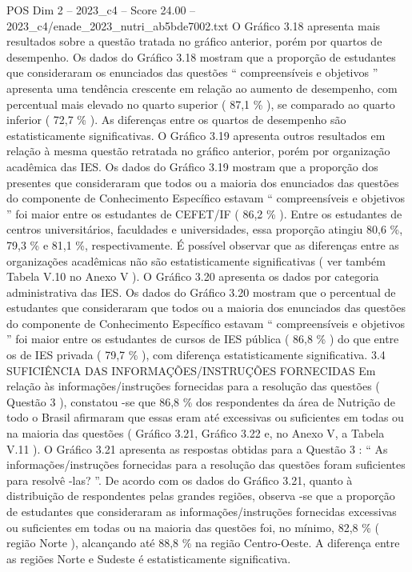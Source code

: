 \begin{textsample}{POS Dim 2 – 2023\_c4 – Score 24.00 – 2023\_c4/enade\_2023\_nutri\_ab5bde7002.txt}
O Gráfico 3.18 apresenta mais resultados sobre a questão tratada no gráfico anterior, porém por quartos de desempenho.
Os dados do Gráfico 3.18 mostram que a proporção de estudantes que consideraram os enunciados das questões “ compreensíveis e objetivos ” apresenta uma tendência crescente em relação ao aumento de desempenho, com percentual mais elevado no quarto superior ( 87,1 \% ), se comparado ao quarto inferior ( 72,7 \% ).
As diferenças entre os quartos de desempenho são estatisticamente significativas.
O Gráfico 3.19 apresenta outros resultados em relação à mesma questão retratada no gráfico anterior, porém por organização acadêmica das IES.
Os dados do Gráfico 3.19 mostram que a proporção dos presentes que consideraram que todos ou a maioria dos enunciados das questões do componente de Conhecimento Específico estavam “ compreensíveis e objetivos ” foi maior entre os estudantes de CEFET/IF ( 86,2 \% ).
Entre os estudantes de centros universitários, faculdades e universidades, essa proporção atingiu 80,6 \%, 79,3 \% e 81,1 \%, respectivamente.
É possível observar que as diferenças entre as organizações acadêmicas não são estatisticamente significativas ( ver também Tabela V.10 no Anexo V ).
O Gráfico 3.20 apresenta os dados por categoria administrativa das IES.
Os dados do Gráfico 3.20 mostram que o percentual de estudantes que consideraram que todos ou a maioria dos enunciados das questões do componente de Conhecimento Específico estavam “ compreensíveis e objetivos ” foi maior entre os estudantes de cursos de IES pública ( 86,8 \% ) do que entre os de IES privada ( 79,7 \% ), com diferença estatisticamente significativa. 3.4 SUFICIÊNCIA DAS INFORMAÇÕES/INSTRUÇÕES FORNECIDAS Em relação às informações/instruções fornecidas para a resolução das questões ( Questão 3 ), constatou -se que 86,8 \% dos respondentes da área de Nutrição de todo o Brasil afirmaram que essas eram até excessivas ou suficientes em todas ou na maioria das questões ( Gráfico 3.21, Gráfico 3.22 e, no Anexo V, a Tabela V.11 ).
O Gráfico 3.21 apresenta as respostas obtidas para a Questão 3 : “ As informações/instruções fornecidas para a resolução das questões foram suficientes para resolvê -las? ”.
De acordo com os dados do Gráfico 3.21, quanto à distribuição de respondentes pelas grandes regiões, observa -se que a proporção de estudantes que consideraram as informações/instruções fornecidas excessivas ou suficientes em todas ou na maioria das questões foi, no mínimo, 82,8 \% ( região Norte ), alcançando até 88,8 \% na região Centro-Oeste.
A diferença entre as regiões Norte e Sudeste é estatisticamente significativa.

\end{textsample}
